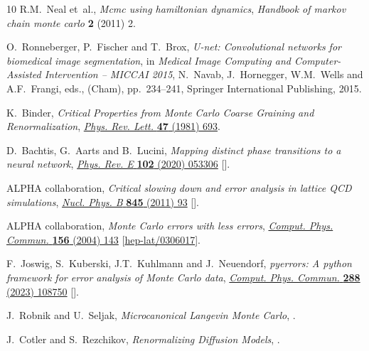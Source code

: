 \begin{thebibliography}{10}
R.M.~Neal et~al., \emph{Mcmc using hamiltonian dynamics}, {\emph{Handbook of
  markov chain monte carlo} {\bfseries 2} (2011) 2}.

O.~Ronneberger, P.~Fischer and T.~Brox, \emph{U-net: Convolutional networks for
  biomedical image segmentation},  in \emph{Medical Image Computing and
  Computer-Assisted Intervention -- MICCAI 2015}, N.~Navab, J.~Hornegger,
  W.M.~Wells and A.F.~Frangi, eds., (Cham), pp.~234--241, Springer
  International Publishing, 2015.

K.~Binder, \emph{{Critical Properties from Monte Carlo Coarse Graining and
  Renormalization}},
  \href{https://doi.org/10.1103/PhysRevLett.47.693}{\emph{Phys. Rev. Lett.}
  {\bfseries 47} (1981) 693}.

D.~Bachtis, G.~Aarts and B.~Lucini, \emph{{Mapping distinct phase transitions
  to a neural network}},
  \href{https://doi.org/10.1103/PhysRevE.102.053306}{\emph{Phys. Rev. E}
  {\bfseries 102} (2020) 053306}
  [\href{https://arxiv.org/abs/2007.00355}{{}}].

{\scshape ALPHA} collaboration, \emph{{Critical slowing down and error analysis
  in lattice QCD simulations}},
  \href{https://doi.org/10.1016/j.nuclphysb.2010.11.020}{\emph{Nucl. Phys. B}
  {\bfseries 845} (2011) 93} [\href{https://arxiv.org/abs/1009.5228}{{}}].

{\scshape ALPHA} collaboration, \emph{{Monte Carlo errors with less errors}},
  \href{https://doi.org/10.1016/S0010-4655(03)00467-3}{\emph{Comput. Phys.
  Commun.} {\bfseries 156} (2004) 143}
  [\href{https://arxiv.org/abs/hep-lat/0306017}{{\ttfamily hep-lat/0306017}}].

F.~Joswig, S.~Kuberski, J.T.~Kuhlmann and J.~Neuendorf, \emph{{pyerrors: A
  python framework for error analysis of Monte Carlo data}},
  \href{https://doi.org/10.1016/j.cpc.2023.108750}{\emph{Comput. Phys. Commun.}
  {\bfseries 288} (2023) 108750}
  [\href{https://arxiv.org/abs/2209.14371}{{}}].

J.~Robnik and U.~Seljak, \emph{{Microcanonical Langevin Monte Carlo}},
  \href{https://arxiv.org/abs/2303.18221}{{}}.

J.~Cotler and S.~Rezchikov, \emph{{Renormalizing Diffusion Models}},
  \href{https://arxiv.org/abs/2308.12355}{{}}.

\end{thebibliography}\endgroup
